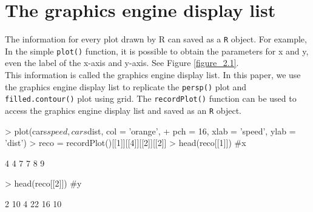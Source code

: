 \documentclass{report}
\begin{document}
\chapter{The graphics engine display list}
The information for every plot drawn by R can saved as a \texttt{R} object. For example, In the simple \texttt{plot()} function, it is possible to obtain the parameters for x and y, even the label of the x-axis and y-axis. See Figure \ref{figure_2.1}.\\

This information is called the graphics engine display list. In this paper, we use the graphics engine display list to replicate the \texttt{persp()} plot and \texttt{filled.contour()} plot using grid. The \texttt{recordPlot()} function can be used to access the graphics engine display list and saved as an \texttt{R} object.

\begin{Schunk}
\begin{Sinput}
> plot(cars$speed, cars$dist, col = 'orange', 
+       pch = 16, xlab = 'speed', ylab = 'dist')
> reco = recordPlot()[[1]][[4]][[2]][[2]]
> head(reco[[1]]) #x
\end{Sinput}
\begin{Soutput}
[1] 4 4 7 7 8 9
\end{Soutput}
\begin{Sinput}
> head(reco[[2]]) #y
\end{Sinput}
\begin{Soutput}
[1]  2 10  4 22 16 10
\end{Soutput}
\end{Schunk}
\end{document}
